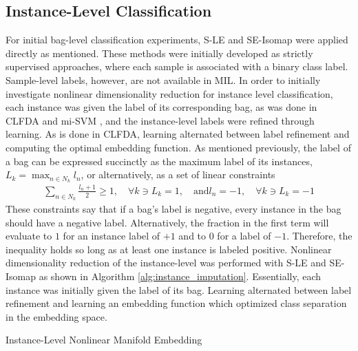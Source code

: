 \subsection{Instance-Level Classification}
For initial bag-level classification experiments, S-LE and SE-Isomap were applied directly as mentioned.  These methods were initially developed as strictly supervised approaches, where each sample is associated with a binary class label.  Sample-level labels, however, are not available in MIL.  In order to initially investigate nonlinear dimensionality reduction for instance level classification, each instance was given the label of its corresponding bag, as was done in CLFDA and mi-SVM \citep{Kim2010LocalDRMIL,Andrews2011MISVM}, and the instance-level labels were refined through learning.  As is done in CLFDA, learning alternated between label refinement and computing the optimal embedding function.  As mentioned previously, the  label of a bag can be expressed succinctly as the maximum label of its instances, $L_{k} = \max_{n \in N_{k}}l_{n}$, or alternatively, as a set of linear constraints
\begin{align}
	\sum_{n \in N_{k}} \frac{l_{n} + 1}{2} \geq 1, \quad \forall k \ni L_{k} = 1, \quad \text{and} l_{n} = -1, \quad \forall k \ni L_{k} = -1
\end{align}
\noindent
These constraints say that if a bag's label is negative, every instance in the bag should have a negative label.  Alternatively, the fraction in the first term will evaluate to $1$ for an instance label of $+1$ and to $0$ for a label of $-1$.  Therefore, the inequality holds so long as at least one instance is labeled positive.  Nonlinear dimensionality reduction of the instance-level was performed with S-LE and SE-Isomap as shown in Algorithm \ref{alg:instance_imputation}.  Essentially, each instance was initially given the label of its bag.  Learning alternated between label refinement and learning an embedding function which optimized class separation in the embedding space.

\begin{algorithm}[h!]
	\caption{Instance-Level Nonlinear Manifold Embedding}
	\label{alg:instance_imputation}
	\begin{algorithmic}[1]
			
			\EndIf
		\EndFor
		\EndWhile  
	\end{algorithmic}
\end{algorithm}


